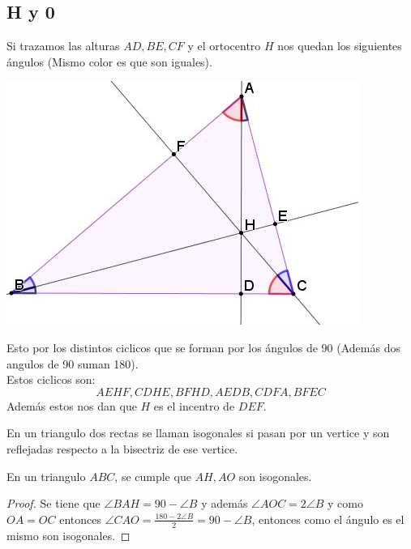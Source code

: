 \documentclass[11pt]{scrartcl}
\begin{document}
\subsection{H y 0}
    Si trazamos las alturas $AD,BE,CF$ y el ortocentro $H$ nos quedan los siguientes \'angulos (Mismo color es que son iguales).
    \begin{center}
        \includegraphics[scale=0.8]{AC6.jpg}
    \end{center}
    Esto por los distintos ciclicos que se forman por los \'angulos de 90 (Adem\'as dos angulos de 90 suman 180). \\
    Estos ciclicos son: 
    $$AEHF, CDHE, BFHD, AEDB, CDFA, BFEC$$
    Adem\'as estos nos dan que $H$ es el incentro de $DEF$. 
    \begin{definition}
        En un triangulo dos rectas se llaman isogonales si pasan por un vertice y son reflejadas respecto a la bisectriz de ese vertice. 
    \end{definition}
    \begin{theorem}
        En un triangulo $ABC$, se cumple que $AH, AO$ son isogonales.
    \end{theorem}
    \begin{proof}
        Se tiene que $\angle BAH=90-\angle B$ y adem\'as $\angle AOC=2\angle B$ y como $OA=OC$ entonces $\angle CAO=\frac{180-2\angle B}{2}=90-\angle B$, entonces como el \'angulo es el mismo son isogonales.
    \end{proof}

 
\end{document}
